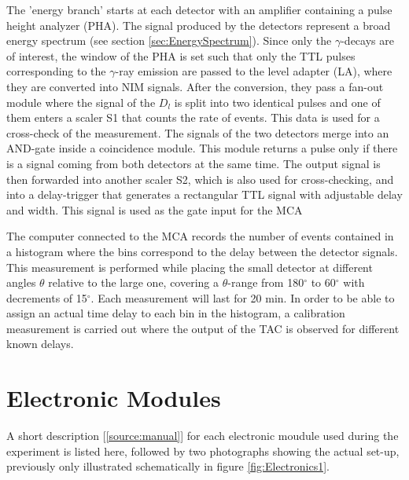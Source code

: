 \documentclass[a4paper,parskip,11pt, DIV12]{scrreprt}
\begin{document}
 The 'energy branch' starts at each detector with an amplifier containing a pulse height analyzer (PHA). The signal produced by the detectors represent a broad energy spectrum (see section \ref{sec:EnergySpectrum}). Since only the $\gamma$-decays are of interest, the window of the PHA is set such that only the TTL pulses corresponding to the $\gamma$-ray emission are passed to the level adapter (LA), where they are converted into NIM signals. After the conversion, they pass a fan-out module where the signal of the $D_l$ is split into two identical pulses and one of them enters a scaler S1 that counts the rate of events. This data is used for a cross-check of the measurement. The signals of the two detectors merge into an AND-gate inside a coincidence module. This module returns a pulse only if there is a signal coming from both detectors at the same time. The output signal is then forwarded into another scaler S2, which is also used for cross-checking, and into a delay-trigger that generates a rectangular TTL signal with adjustable delay and width. This signal is used as the gate input for the MCA

The computer connected to the MCA records the number of events contained in a histogram where the bins correspond to the delay between the detector signals. This measurement is performed while placing the small detector at different angles $\theta$ relative to the large one, covering a $\theta$-range from 180$^\circ$ to 60$^\circ$ with decrements of 15$^\circ$. Each measurement will last for 20 min. In order to be able to assign an actual time delay to each bin in the histogram, a calibration measurement is carried out where the output of the TAC is observed for different known delays. 


\section{Electronic Modules} \label{sec:modules}

A short description [\ref{source:manual}] for each electronic moudule used during the experiment is listed here, followed by two photographs showing the actual set-up, previously only illustrated schematically in figure \ref{fig:Electronics1}.
\end{document}
